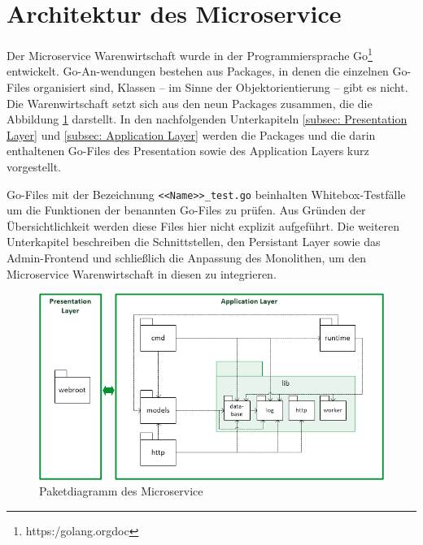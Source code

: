 \section{Architektur des Microservice}
\label{sec: Architektur des Microservice}
Der Microservice Warenwirtschaft wurde in der Programmiersprache Go\footnote{https:\//golang.org\/doc\/} entwickelt. Go-An-wendungen bestehen aus Packages, in denen die einzelnen Go-Files organisiert sind, Klassen -- im Sinne der Objektorientierung -- gibt es nicht. Die Warenwirtschaft setzt sich aus den neun Packages zusammen, die die Abbildung \ref{pic:Struktur des Microservice} darstellt. In den nachfolgenden Unterkapiteln \ref{subsec: Presentation Layer} und \ref{subsec: Application Layer} werden die Packages und die darin enthaltenen Go-Files des Presentation sowie des Application Layers kurz vorgestellt. \par 
Go-Files mit der Bezeichnung \texttt{<<Name>>\_test.go} beinhalten Whitebox-Testfälle um die Funktionen der benannten Go-Files zu prüfen. Aus Gründen der Übersichtlichkeit werden diese Files hier nicht explizit aufgeführt. Die weiteren Unterkapitel beschreiben die Schnittstellen, den Persistant Layer sowie das Admin-Frontend und schließlich die Anpassung des Monolithen, um den Microservice Warenwirtschaft in diesen zu integrieren. 

\begin{figure}[H]
	\centering
	\includegraphics[width=0.95 \textwidth]{./pics/struktur.png}
	\caption{Paketdiagramm des Microservice}
	\label{pic:Struktur des Microservice}
\end{figure}

\newpage
